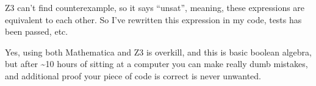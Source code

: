 Z3 can't find counterexample, so it says ``unsat'', meaning, these expressions are equivalent to each other.
So I've rewritten this expression in my code, tests has been passed, etc.

Yes, using both Mathematica and Z3 is overkill, and this is basic boolean algebra,
but after \textasciitilde{}10 hours of sitting at a computer you can make really dumb mistakes,
and additional proof your piece of code is correct is never unwanted.

